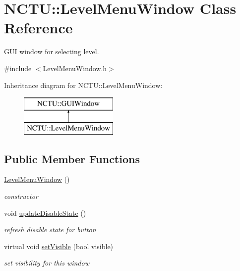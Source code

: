 \hypertarget{class_n_c_t_u_1_1_level_menu_window}{}\section{N\+C\+TU\+:\+:Level\+Menu\+Window Class Reference}
\label{class_n_c_t_u_1_1_level_menu_window}


G\+UI window for selecting level.  




{\ttfamily \#include $<$Level\+Menu\+Window.\+h$>$}

Inheritance diagram for N\+C\+TU\+:\+:Level\+Menu\+Window\+:\begin{figure}[H]
\begin{center}
\leavevmode
\includegraphics[height=2.000000cm]{class_n_c_t_u_1_1_level_menu_window}
\end{center}
\end{figure}
\subsection*{Public Member Functions}
\begin{DoxyCompactItemize}
\item 
\hyperlink{class_n_c_t_u_1_1_level_menu_window_afeec578e03f2484d2b944e87d75b4390}{Level\+Menu\+Window} ()\hypertarget{class_n_c_t_u_1_1_level_menu_window_afeec578e03f2484d2b944e87d75b4390}{}\label{class_n_c_t_u_1_1_level_menu_window_afeec578e03f2484d2b944e87d75b4390}

\begin{DoxyCompactList}\small\item\em constructor \end{DoxyCompactList}\item 
void \hyperlink{class_n_c_t_u_1_1_level_menu_window_a71a268adcfe5e54548cde85ac721c460}{update\+Disable\+State} ()\hypertarget{class_n_c_t_u_1_1_level_menu_window_a71a268adcfe5e54548cde85ac721c460}{}\label{class_n_c_t_u_1_1_level_menu_window_a71a268adcfe5e54548cde85ac721c460}

\begin{DoxyCompactList}\small\item\em refresh disable state for button \end{DoxyCompactList}\item 
virtual void \hyperlink{class_n_c_t_u_1_1_level_menu_window_aa7ff80563c2fa737d0df71d6ef4ff69d}{set\+Visible} (bool visible)\hypertarget{class_n_c_t_u_1_1_level_menu_window_aa7ff80563c2fa737d0df71d6ef4ff69d}{}\label{class_n_c_t_u_1_1_level_menu_window_aa7ff80563c2fa737d0df71d6ef4ff69d}

\begin{DoxyCompactList}\small\item\em set visibility for this window \end{DoxyCompactList}\end{DoxyCompactItemize}
